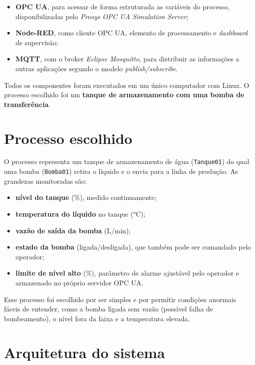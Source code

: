 \documentclass[11pt,a4paper]{article}
\begin{document}
\begin{itemize}
  \item \textbf{OPC UA}, para acessar de forma estruturada as variáveis do
        processo, disponibilizadas pelo \emph{Prosys OPC UA Simulation Server};
  \item \textbf{Node-RED}, como cliente OPC UA, elemento de processamento e
        \emph{dashboard} de supervisão;
  \item \textbf{MQTT}, com o broker \emph{Eclipse Mosquitto}, para distribuir as
        informações a outras aplicações segundo o modelo
        \emph{publish/subscribe}.
\end{itemize}

Todos os componentes foram executados em um único computador com Linux. O
processo escolhido foi um \textbf{tanque de armazenamento com uma bomba de
transferência}.

\section{Processo escolhido}

O processo representa um tanque de armazenamento de água (\texttt{Tanque01}) do
qual uma bomba (\texttt{Bomba01}) retira o líquido e o envia para a linha de
produção. As grandezas monitoradas são:

\begin{itemize}
  \item \textbf{nível do tanque} (\%), medido continuamente;
  \item \textbf{temperatura do líquido} no tanque (°C);
  \item \textbf{vazão de saída da bomba} (L/min);
  \item \textbf{estado da bomba} (ligada/desligada), que também pode ser
        comandado pelo operador;
  \item \textbf{limite de nível alto} (\%), parâmetro de alarme ajustável pelo
        operador e armazenado no próprio servidor OPC UA.
\end{itemize}

Esse processo foi escolhido por ser simples e por permitir condições anormais
fáceis de entender, como a bomba ligada sem vazão (possível falha de
bombeamento), o nível fora da faixa e a temperatura elevada.

\section{Arquitetura do sistema}
\end{document}
